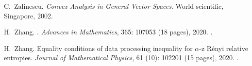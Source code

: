 \documentclass[12pt]{article}
\theoremstyle{definition}
\theoremstyle{remark}
\numberwithin{equation}{section}
\begin{document}
\begin{thebibliography}{27}
C.~Zalinescu.
\newblock \emph{Convex Analysis in General Vector Spaces}.
\newblock World scientific, Singapore, 2002.

H.~Zhang.
.
\newblock \emph{Advances in Mathematics}, 365: 107053 (18 pages),
  2020{}.
\newblock {}.

H.~Zhang.
\newblock Equality conditions of data processing inequality for $\alpha$-z
  {R}{\'e}nyi relative entropies.
\newblock \emph{Journal of Mathematical Physics}, 61 (10):
102201 (15 pages), 2020{}.
\newblock {}.

\end{thebibliography}
\end{document}
